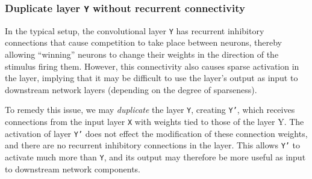 \documentclass{article}
\begin{document}
\subsubsection{Duplicate layer \texttt{Y} without recurrent connectivity}

In the typical setup, the convolutional layer \texttt{Y} has recurrent inhibitory connections that cause competition to take place between neurons, thereby allowing ``winning'' neurons to change their weights in the direction of the stimulus firing them. However, this connectivity also causes sparse activation in the layer, implying that it may be difficult to use the layer's output as input to downstream network layers (depending on the degree of sparseness).

To remedy this issue, we may \textit{duplicate} the layer \texttt{Y}, creating \texttt{Y'}, which receives connections from the input layer \texttt{X} with weights tied to those of the layer {Y}. The activation of layer \texttt{Y'} does not effect the modification of these connection weights, and there are no recurrent inhibitory connections in the layer. This allows \texttt{Y'} to activate much more than \texttt{Y}, and its output may therefore be more useful as input to downstream network components.
\end{document}
